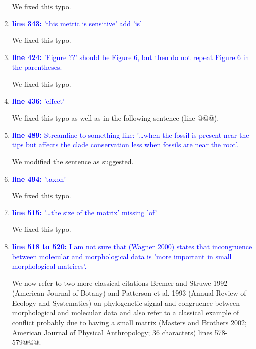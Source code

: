 \documentclass[12pt,letterpaper]{article}
\begin{document}
\begin{enumerate}
We fixed this typo.

\item{\textcolor{blue}{\textbf{line 343:} 'this metric is sensitive' add 'is'}}

We fixed this typo.

\item{\textcolor{blue}{\textbf{line 424:} 'Figure ??' should be Figure 6, but then do not repeat Figure 6 in the parentheses. }}

We fixed this typo.

\item{\textcolor{blue}{\textbf{line 436:} 'effect'}}

We fixed this typo as well as in the following sentence (line @@@).

\item{\textcolor{blue}{\textbf{line 489:} Streamline to something like: '…when the fossil is present near the tips but affects the clade conservation less when fossils are near the root'. }}

We modified the sentence as suggested.

\item{\textcolor{blue}{\textbf{line 494:} 'taxon'}}

We fixed this typo.

\item{\textcolor{blue}{\textbf{line 515:} '…the size of the matrix' missing 'of'}}

We fixed this typo.

\item{\textcolor{blue}{\textbf{line 518 to 520:} I am not sure that (Wagner 2000) states that incongruence between molecular and morphological data is 'more important in small morphological matrices'. }}

We now refer to two more classical citations Bremer and Struwe 1992 (American Journal of Botany) and Patterson et al. 1993 (Annual Review of Ecology and Systematics) on phylogenetic signal and congruence between morphological and molecular data and also refer to a classical example of conflict probably due to having a small matrix (Masters and Brothers 2002; American Journal of Physical Anthropology; 36 characters) lines 578-579@@@.


\end{enumerate}
\end{document}
